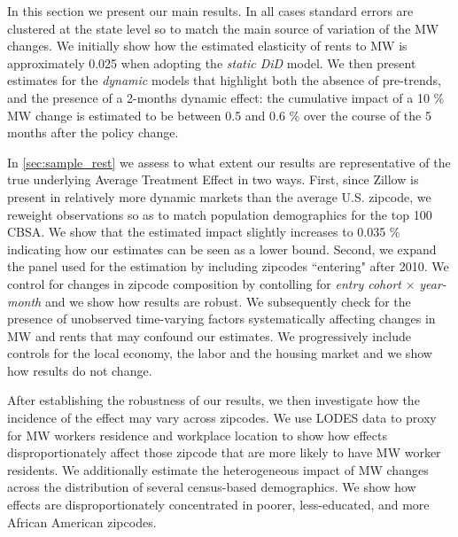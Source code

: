 
In this section we present our main results. In all cases standard errors are clustered at the 
state level so to match the main source of variation of the MW changes. We initially show how the 
estimated elasticity of rents to MW is approximately 0.025 when adopting the \textit{static DiD} 
model. We then present estimates for the \textit{dynamic} models that highlight both the absence 
of pre-trends, and the presence of a 2-months dynamic effect: the cumulative impact of a 10 \% MW 
change is estimated to be between 0.5 and 0.6 \% over the course of the 5 months after the policy 
change.

In \autoref{sec:sample_rest} we assess to what extent our results are representative of the true 
underlying Average Treatment Effect in two ways. First, since Zillow is present in relatively more 
dynamic markets than the average U.S. zipcode, we reweight observations so as to match population 
demographics for the top 100 CBSA. We show that the estimated impact slightly increases to 0.035 
\% indicating how our estimates can be seen as a lower bound. Second, we expand the panel used 
for the estimation by including zipcodes ``entering" after 2010. We control for changes in zipcode 
composition by contolling for \textit{entry cohort} $\times$ \textit{year-month} and we show how 
results are robust. We subsequently check for the presence of unobserved time-varying factors 
systematically affecting changes in MW and rents that may confound our estimates. We progressively 
include controls for the local economy, the labor and the housing market and we show how results 
do not change.

After establishing the robustness of our results, we then investigate how the incidence of the 
effect may vary across zipcodes. We use LODES data to proxy for MW workers residence and workplace 
location to show how effects disproportionately affect those zipcode that are more likely to have 
MW worker residents. We additionally estimate the heterogeneous impact of MW changes across the 
distribution of several census-based demographics. We show how effects are disproportionately 
concentrated in poorer, less-educated, and more African American zipcodes.


